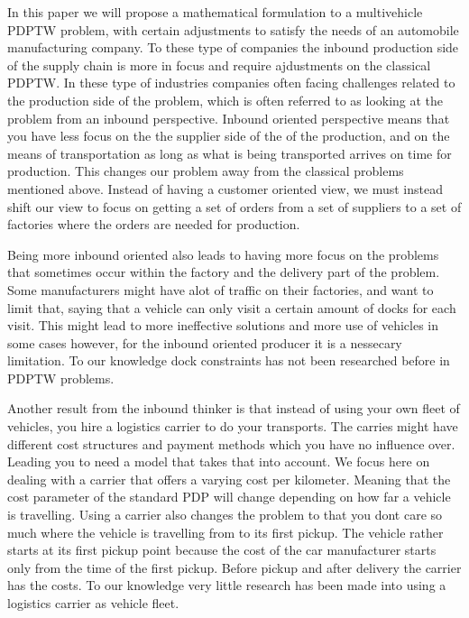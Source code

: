 \documentclass[a4paper,12pt]{article}
\begin{document}
In this paper we will propose a mathematical formulation to a multivehicle PDPTW problem, with certain adjustments to satisfy the needs of an automobile manufacturing company.
To these type of companies the inbound production side of the supply chain is more in focus and require ajdustments on the classical PDPTW.
In these type of industries companies often facing challenges related to the production side of the problem, which is often referred to as looking at the problem from an inbound perspective.
Inbound oriented perspective means that you have less focus on the the supplier side of the of the production, and on the means of transportation as long as what is being transported arrives on time for production.
This changes our problem away from the classical problems mentioned above. 
Instead of having a customer oriented view, we must instead shift our view to focus on getting a set of orders from a set of suppliers to a set of factories where the orders are needed for production. 
\par
Being more inbound oriented also leads to having more focus on the problems that sometimes occur within the factory and the delivery part of the problem.
Some manufacturers might have alot of traffic on their factories, and want to limit that, saying that a vehicle can only visit a certain amount of docks for each visit.
This might lead to more ineffective solutions and more use of vehicles in some cases however, for the inbound oriented producer it is a nessecary limitation. To our knowledge dock constraints has not been researched before in PDPTW problems. \par

Another result from the inbound thinker is that instead of using your own fleet of vehicles, you hire a logistics carrier to do your transports.
The carries might have different cost structures and payment methods which you have no influence over.
Leading you to need a model that takes that into account.
We focus here on dealing with a carrier that offers a varying cost per kilometer.
Meaning that the cost parameter of the standard PDP will change depending on how far a vehicle is travelling. 
Using a carrier also changes the problem to that you dont care so much where the vehicle is travelling from to its first pickup.   
The vehicle rather starts at its first pickup point because the cost of the car manufacturer starts only from the time of the first pickup.
Before pickup and after delivery the carrier has the costs. To our knowledge very little research has been made into using a logistics carrier as vehicle fleet. \par
\end{document}
